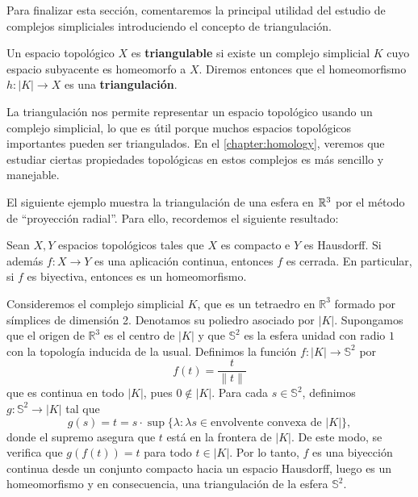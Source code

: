 Para finalizar esta sección, comentaremos la principal utilidad del estudio de
complejos simpliciales introduciendo el concepto de triangulación.

\begin{definicion}
	Un espacio topológico $X$ es \textbf{triangulable} si existe un complejo
	simplicial $K$ cuyo espacio subyacente es homeomorfo a $X$. Diremos entonces que
	el homeomorfismo $h: |K| \rightarrow X$ es una \textbf{triangulación}.
\end{definicion}

La triangulación nos permite representar un espacio topológico usando un complejo
simplicial, lo que es útil porque muchos espacios topológicos importantes pueden
ser triangulados. En el \autoref{chapter:homology}, veremos que estudiar ciertas
propiedades topológicas en estos complejos es más sencillo y manejable.

El siguiente ejemplo muestra la triangulación de una esfera en $\mathbb{R}^{3}$ por el
método de \enquote{proyección radial}. Para ello, recordemos el siguiente resultado:

\begin{proposicion}
	\label{lem:closed-map} Sean $X,Y$ espacios topológicos tales que $X$ es compacto
	e $Y$ es Hausdorff. Si además $f: X\to Y$ es una aplicación continua, entonces
	$f$ es cerrada. En particular, si $f$ es biyectiva, entonces es un
	homeomorfismo.
\end{proposicion}

\begin{ejemplo}
	Consideremos el complejo simplicial $K$, que es un tetraedro en
	$\mathbb{R}^{3}$ formado por símplices de dimensión 2. Denotamos su poliedro
	asociado por $|K|$. Supongamos que el origen de $\mathbb{R}^{3}$ es el centro de
	$|K|$ y que $\mathbb{S}^{2}$ es la esfera unidad con radio $1$ con la topología
	inducida de la usual. Definimos la función $f: |K| \to \mathbb{S}^{2}$ por
	\[
	f(t) = \frac{t}{\|t\|}
	\]
	que es continua en todo $|K|$, pues $0 \not \in |K|$. Para cada
	$s \in \mathbb{S}^{2}$, definimos $g: \mathbb{S}^{2} \to |K|$ tal que
	\[
	g(s) = t = s \cdot \sup\{\lambda : \lambda s \in \text{envolvente convexa de }
	|K|\},
	\]
	donde el supremo asegura que $t$ está en la frontera de $|K|$. De este modo, se
	verifica que $g(f(t)) = t$ para todo $t \in |K|$. Por lo tanto, $f$ es una biyección
	continua desde un conjunto compacto hacia un espacio Hausdorff, luego es un
	homeomorfismo y en consecuencia, una triangulación de la esfera $\mathbb{S}^{2}$.
\end{ejemplo}

